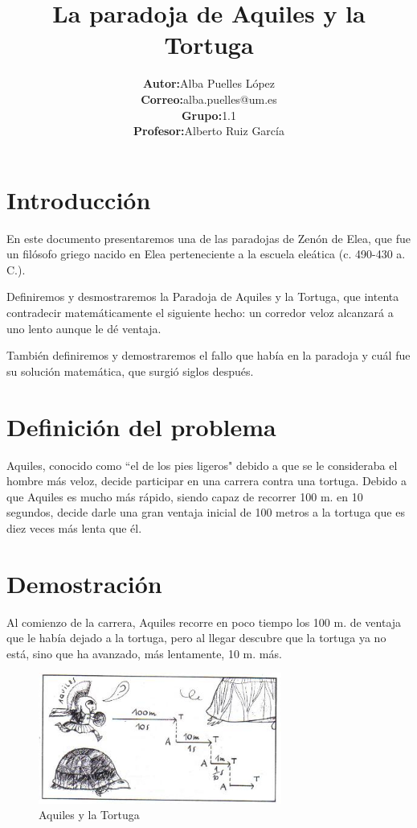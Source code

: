 \documentclass[a4paper,12pt]{article}
\date{}
\title{\textbf{La paradoja de Aquiles y la Tortuga}}
\author{\begin{tabular}{rl}
  \textbf{Autor:} & Alba Puelles López \\
  \textbf{Correo:} & alba.puelles@um.es \\
  \textbf{Grupo:} & 1.1 \\
  \textbf{Profesor:} & Alberto Ruiz García \\
\end{tabular}}
\begin{document}
 
   \maketitle
   
   \newpage

   \tableofcontents

   \newpage
   
   \section{Introducción}
   
   En este documento presentaremos una de las paradojas de Zenón de Elea, que fue un filósofo griego 
   nacido en Elea perteneciente a la escuela eleática (c. 490-430 a. C.).  
   
   Definiremos y desmostraremos la Paradoja de Aquiles y la Tortuga, que intenta contradecir matemáticamente
   el siguiente hecho: un corredor veloz alcanzará a uno lento aunque le dé ventaja.

   También definiremos y demostraremos el fallo que había en la paradoja y cuál fue
   su solución matemática, que surgió siglos después.
   
   \section{Definición del problema}
   
   Aquiles, conocido como ``el de los pies ligeros" debido a que se le consideraba 
   el hombre más veloz, decide participar en una carrera contra una tortuga. 
   Debido a que Aquiles es mucho más rápido, siendo capaz de recorrer 100 m. en 10 segundos, 
   decide darle una gran ventaja inicial de 100 metros a la tortuga que es diez 
   veces más lenta que él. 
   
   \section{Demostración}
   
   Al comienzo de la carrera, Aquiles recorre en poco tiempo los 100 m. 
   de ventaja que le había dejado a la tortuga, pero al llegar descubre 
   que la tortuga ya no está, sino que ha avanzado, más lentamente,
   10 m. más. 
   
   \begin{figure}[h]
   \begin{center}
   \includegraphics[width=8cm]{Imagenes/aquiles2.jpg}
   \end{center}
   \caption{Aquiles y la Tortuga}
   \label{fig:playa}
   \end{figure}
   
\end{document}
